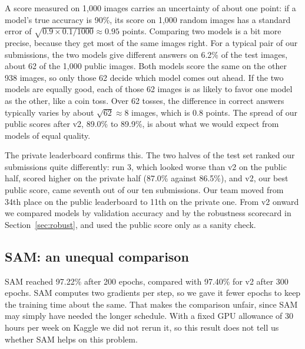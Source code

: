 \documentclass{article}
\begin{document}
A score measured on 1,000 images carries an uncertainty of about one point: if a model's true accuracy is 90\%, its score
on 1,000 random images has a standard error of $\sqrt{0.9 \times 0.1 / 1000} \approx 0.95$ points. Comparing two models is
a bit more precise, because they get most of the same images right. For a typical pair of our submissions, the two models
give different answers on 6.2\% of the test images, about 62 of the 1,000 public images. Both models score the same on the
other 938 images, so only those 62 decide which model comes out ahead. If the two models are equally good, each of those
62 images is as likely to favor one model as the other, like a coin toss. Over 62 tosses, the difference in correct answers
typically varies by about $\sqrt{62} \approx 8$ images, which is 0.8 points. The spread of our public scores after v2,
89.0\% to 89.9\%, is about what we would expect from models of equal quality.

The private leaderboard confirms this. The two halves of the test set ranked our submissions quite differently: run 3,
which looked worse than v2 on the public half, scored higher on the private half (87.0\% against 86.5\%), and v2, our best
public score, came seventh out of our ten submissions. Our team moved from 34th place on the public leaderboard to 11th
on the private one. From v2 onward we compared models by validation accuracy and by the robustness scorecard in
Section~\ref{sec:robust}, and used the public score only as a sanity check.

\subsection{SAM: an unequal comparison}
SAM reached 97.22\% after 200 epochs, compared with 97.40\% for v2 after 300 epochs. SAM computes two gradients per step,
so we gave it fewer epochs to keep the training time about the same. That makes the comparison unfair, since SAM may
simply have needed the longer schedule. With a fixed GPU allowance of 30 hours per week on Kaggle we did not rerun it, so
this result does not tell us whether SAM helps on this problem.
\end{document}
